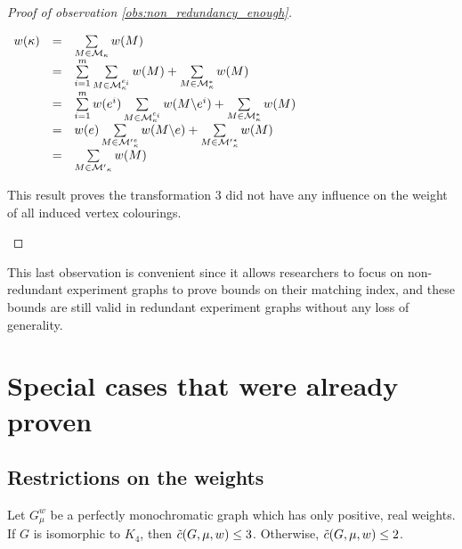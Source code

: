 \begin{proof}[Proof of observation \ref{obs:non_redundancy_enough}]
\begin{enumerate}
            \begin{center}
                $\begin{array}{r c l}
                    w(\kappa) & = & \sum\limits_{M \in \mathcal{M}_\kappa} w(M)  \\
                              & = & \sum\limits_{i = 1}^m \sum\limits_{M \in \mathcal{M}_\kappa^{e_i}} w(M) + \sum\limits_{M \in \mathcal{M}_\kappa^{*}} w(M) \\
                              & = & \sum\limits_{i = 1}^m w(e^i) \sum\limits_{M \in \mathcal{M}_\kappa^{e_i}} w(M \backslash e^i) + \sum\limits_{M \in \mathcal{M}_\kappa^{*}} w(M) \\
                              & = & w(e) \sum\limits_{M \in \mathcal{M'}_\kappa^{e}} w(M \backslash e) + \sum\limits_{M \in \mathcal{M'}_\kappa^{*}} w(M) \\
                              & = & \sum\limits_{M \in \mathcal{M'}_\kappa} w(M)
                \end{array}$
            \end{center}

            This result proves the transformation 3 did not have any influence on the weight of all induced vertex colourings.
    \end{enumerate}
\end{proof}

This last observation is convenient since it allows researchers to focus on non-redundant experiment graphs to prove bounds on their matching index, and these bounds are still valid in redundant experiment graphs without any loss of generality.


\section{Special cases that were already proven}
\label{sec:proved-special-cases}

\subsection{Restrictions on the weights}
\label{subsec:proved-special-cases-weights}

\begin{lemma}
    \label{lem:real_pos_weights}
    Let $G_\mu^w$ be a perfectly monochromatic graph which has only positive, real weights.
    If $G$ is isomorphic to $K_4$, then $\Tilde{c}(G, \mu, w) \leq 3$.
    Otherwise, $\Tilde{c}(G, \mu, w) \leq 2$.
\end{lemma}

